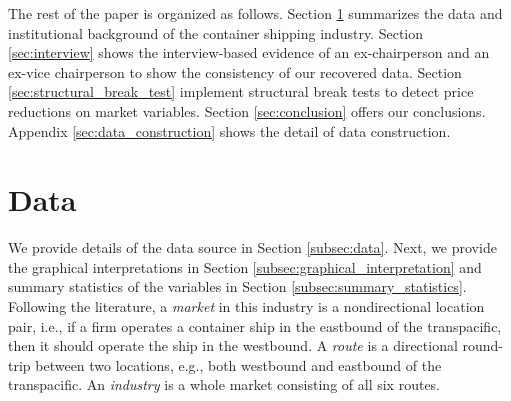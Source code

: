 \documentclass[11pt]{article}
\begin{document}
The rest of the paper is organized as follows. Section \ref{sec:data} summarizes the data and institutional background of the container shipping industry. Section \ref{sec:interview} shows the interview-based evidence of an ex-chairperson and an ex-vice chairperson to show the consistency of our recovered data. Section \ref{sec:structural_break_test} implement structural break tests to detect price reductions on market variables. Section \ref{sec:conclusion} offers our conclusions. Appendix \ref{sec:data_construction} shows the detail of data construction.

\section{Data}\label{sec:data}

We provide details of the data source in Section \ref{subsec:data}. Next, we provide the graphical interpretations in Section \ref{subsec:graphical_interpretation} and summary statistics of the variables in Section \ref{subsec:summary_statistics}. Following the literature, a \textit{market} in this industry is a nondirectional location pair, i.e., if a firm operates a container ship in the eastbound of the transpacific, then it should operate the ship in the westbound. A \textit{route} is a directional round-trip between two locations, e.g., both westbound and eastbound of the transpacific. An \textit{industry} is a whole market consisting of all six routes.
\end{document}
